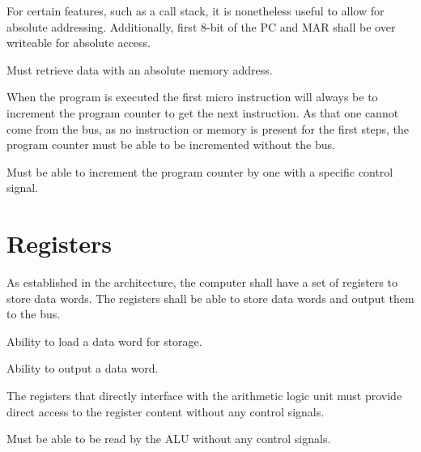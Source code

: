 For certain features, such as a call stack, it is nonetheless useful to allow for absolute addressing. Additionally, first 8-bit of the PC and MAR shall be over writeable for absolute access.

\begin{feat-requirement}
Must retrieve data with an absolute memory address. 
\end{feat-requirement}


When the program is executed the first micro instruction will always be to increment the program counter to get the next instruction. As that one cannot come from the bus, as no instruction or memory is present for the first steps, the program counter must be able to be incremented without the bus.
\begin{feat-requirement}
    Must be able to increment the program counter by one with a specific control signal.
\end{feat-requirement}

\section{Registers}
As established in the architecture, the computer shall have a set of registers to store data words. The registers shall be able to store data words and output them to the bus.

\begin{feat-requirement}
  Ability to load a data word for storage.
\end{feat-requirement}

\begin{feat-requirement}
  Ability to output a data word.
\end{feat-requirement}

The registers that directly interface with the arithmetic logic unit must provide direct access to the register content without any control signals. 

\begin{arch-requirement} \label{req:register-direct-access}
  Must be able to be read by the ALU without any control signals.
\end{arch-requirement}


